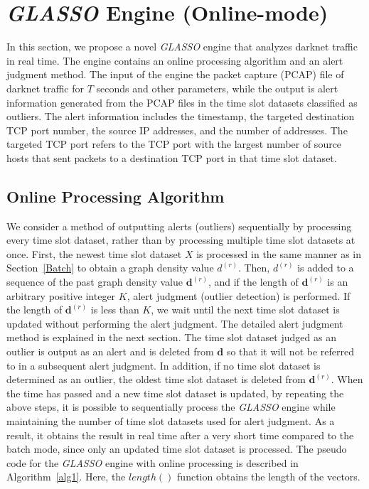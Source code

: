 \documentclass[conference]{IEEEtran}
\begin{document}
\section{\textit{GLASSO} Engine (Online-mode)}
\label{GLASSO}
In this section, we propose a novel \textit{GLASSO} engine that analyzes darknet traffic in real time.
The engine contains an online processing algorithm and an alert judgment method.
The input of the engine the packet capture (PCAP) file of darknet traffic for $T$ seconds and other parameters, while the output is alert information generated from the PCAP files in the time slot datasets classified as outliers.
The alert information includes the timestamp, the targeted destination TCP port number, the source IP addresses, and the number of addresses.
The targeted TCP port refers to the TCP port with the largest number of source hosts that sent packets to a destination TCP port in that time slot dataset.


\subsection{Online Processing Algorithm}
We consider a method of outputting alerts (outliers) sequentially by processing every time slot dataset, rather than by processing multiple time slot datasets at once.
First, the newest time slot dataset $X$ is processed in the same manner as in Section~\ref{Batch} to obtain a graph density value $d^{(r)}$.
Then, $d^{(r)}$ is added to a sequence of the past graph density value $\bm{d}^{(r)}$, and if the length of $\bm{d}^{(r)}$ is an arbitrary positive integer $K$, alert judgment (outlier detection) is performed.
If the length of $\bm{d}^{(r)}$ is less than $K$, we wait until the next time slot dataset is updated without performing the alert judgment.
The detailed alert judgment method is explained in the next section.
The time slot dataset judged as an outlier is output as an alert and is deleted from $\bm{d}$ so that it will not be referred to in a subsequent alert judgment.
In addition, if no time slot dataset is determined as an outlier, the oldest time slot dataset is deleted from $\bm{d}^{(r)}$.
When the time has passed and a new time slot dataset is updated, by repeating the above steps, it is possible to sequentially process the \textit{GLASSO} engine while maintaining the number of time slot datasets used for alert judgment.
As a result, it obtains the result in real time after a very short time compared to the batch mode, since only an updated time slot dataset is processed.
The pseudo code for the \textit{GLASSO} engine with online processing is described in Algorithm~\ref{alg1}.
Here, the $length()$ function obtains the length of the vectors.
\end{document}
